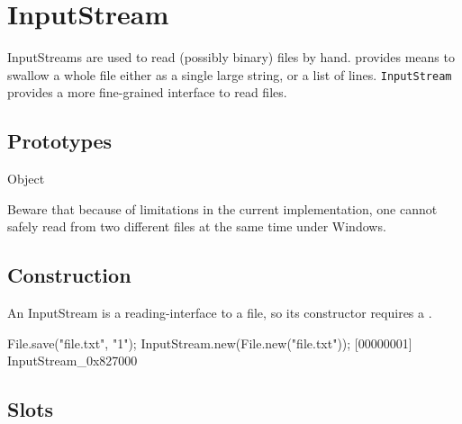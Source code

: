 
\section{InputStream}

InputStreams are used to read (possibly binary) files by hand.
 provides means to swallow a whole file either as a
single large string, or a list of lines.  \lstinline|InputStream|
provides a more fine-grained interface to read files.

\subsection{Prototypes}
\begin{refObjects}
\item[Object]
\end{refObjects}

\begin{windows}
  Beware that because of limitations in the current implementation,
  one cannot safely read from two different files at the same time
  under Windows.
\end{windows}

\subsection{Construction}

An InputStream is a reading-interface to a file, so its constructor
requires a .

\begin{urbiscript}[firstnumber=1]
File.save("file.txt", "1\n");
InputStream.new(File.new("file.txt"));
[00000001] InputStream_0x827000
\end{urbiscript}

\subsection{Slots}

